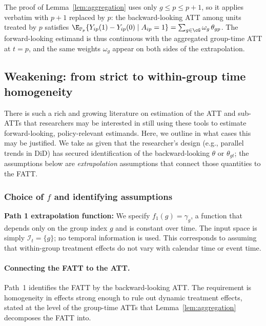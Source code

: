 \documentclass{article}
\renewcommand{\P}{\mathbb{P}}
\begin{document}
\begin{remark}\label{rem:boundary}
The proof of Lemma~\ref{lem:aggregation} uses only $g \leq p \leq p+1$, so it applies verbatim with $p+1$ replaced by $p$: the backward-looking ATT among units treated by $p$ satisfies $\E_{\P_p}\{Y_{ip}(1)-Y_{ip}(0) \mid A_{ip}=1\} = \sum_{g\in\cG}\omega_g\,\theta_{gp}$. The forward-looking estimand is thus continuous with the aggregated group-time ATT at $t=p$, and the same weights $\omega_g$ appear on both sides of the extrapolation.
\end{remark}

\subsection{Weakening: from strict to within-group time homogeneity}\label{sec:path1}

There is such a rich and growing literature on estimation of the ATT and sub-ATTs \citep{wangAdvancesDifferenceindifferencesMethods2024a,sunEstimatingDynamicTreatment2021} that researchers may be interested in still using these tools to estimate forward-looking, policy-relevant estimands. Here, we outline in what cases this may be justified. We take as given that the researcher's design (e.g., parallel trends in DiD) has secured identification of the backward-looking $\theta$ or $\theta_{gt}$; the assumptions below are \emph{extrapolation} assumptions that connect those quantities to the FATT.

\subsubsection{Choice of $f$ and identifying assumptions}

\textbf{Path 1 extrapolation function:} We specify $f_1(g) = \gamma_g$, a function that depends only on the group index $g$ and is constant over time. The input space is simply $\mathcal{I}_t = \{g\}$; no temporal information is used. This corresponds to assuming that within-group treatment effects do not vary with calendar time or event time.

\paragraph{Connecting the FATT to the ATT.}
Path~1 identifies the FATT by the backward-looking ATT. The requirement is homogeneity in effects strong enough to rule out dynamic treatment effects, stated at the level of the group-time ATTs that Lemma~\ref{lem:aggregation} decomposes the FATT into.
\end{document}
